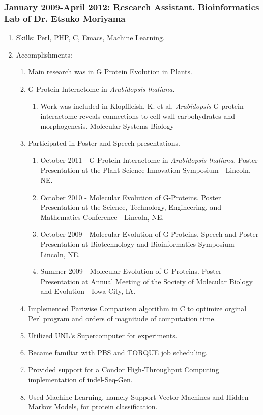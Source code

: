 \documentclass[11pt]{article}
\begin{document}
\subsubsection{January 2009-April 2012: Research Assistant. Bioinformatics Lab of Dr. Etsuko Moriyama}
\label{sec-1-2-2}
\begin{enumerate}
\item Skills: Perl, PHP, C, Emacs, Machine Learning.
\label{sec-1-2-2-1}
\item Accomplishments:
\label{sec-1-2-2-2}
\begin{enumerate}
\item Main research was in G Protein Evolution in Plants.
\label{sec-1-2-2-2-1}
\item G Protein Interactome in \emph{Arabidopsis thaliana}.
\label{sec-1-2-2-2-2}
\begin{enumerate}
\item Work was included in Klopffleish, K. et al. \emph{Arabidopsis} G-protein interactome reveals connections to cell wall carbohydrates and morphogenesis. Molecular Systems Biology
\label{sec-1-2-2-2-2-1}
\end{enumerate}
\item Participated in Poster and Speech presentations.
\label{sec-1-2-2-2-3}
\begin{enumerate}
\item October 2011 - G-Protein Interactome in \emph{Arabidopsis thaliana}. Poster Presentation at the Plant Science Innovation Symposium - Lincoln, NE.
\label{sec-1-2-2-2-3-1}
\item October 2010 - Molecular Evolution of G-Proteins. Poster Presentation at the Science, Technology, Engineering, and Mathematics Conference - Lincoln, NE.
\label{sec-1-2-2-2-3-2}
\item October 2009 - Molecular Evolution of G-Proteins. Speech and Poster Presentation at Biotechnology and Bioinformatics Symposium - Lincoln, NE.
\label{sec-1-2-2-2-3-3}
\item Summer 2009 - Molecular Evolution of G-Proteins. Poster Presentation at Annual Meeting of the Society of Molecular Biology and Evolution - Iowa City, IA.
\label{sec-1-2-2-2-3-4}
\end{enumerate}
\item Implemented Pariwise Comparison algorithm in C to optimize orginal Perl program and orders of magnitude of computation time.
\label{sec-1-2-2-2-4}
\item Utilized UNL's Supercomputer for experiments.
\label{sec-1-2-2-2-5}
\item Became familiar with PBS and TORQUE job scheduling.
\label{sec-1-2-2-2-6}
\item Provided support for a Condor High-Throughput Computing implementation of indel-Seq-Gen.
\label{sec-1-2-2-2-7}
\item Used Machine Learning, namely Support Vector Machines and Hidden Markov Models, for protein classification.
\label{sec-1-2-2-2-8}
\end{enumerate}
\end{enumerate}
\end{document}
